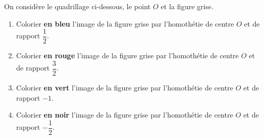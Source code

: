 \begin{exercice*}[Quadrillage]
    On considère le quadrillage ci-dessous, le point $O$ et la figure grise.

    \begin{enumerate}
        \item Colorier \textbf{en bleu} l'image de la figure grise par l'homothétie de centre $O$ et de rapport $\dfrac{1}{2}$.
        \item Colorier \textbf{en rouge} l'image de la figure grise par l'homothétie de centre $O$ et de rapport $\dfrac{3}{2}$.        
        \item Colorier \textbf{en vert} l'image de la figure grise par l'homothétie de centre $O$ et de rapport $-1$.        
        \item Colorier \textbf{en noir} l'image de la figure grise par l'homothétie de centre $O$ et de rapport $-\dfrac{1}{2}$.        
    \end{enumerate}
\end{exercice*}
